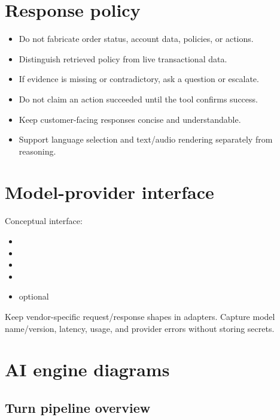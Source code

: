 \section{Response policy}

\begin{itemize}
\item Do not fabricate order status, account data, policies, or actions.
\item Distinguish retrieved policy from live transactional data.
\item If evidence is missing or contradictory, ask a question or escalate.
\item Do not claim an action succeeded until the tool confirms success.
\item Keep customer-facing responses concise and understandable.
\item Support language selection and text/audio rendering separately from reasoning.
\end{itemize}
\section{Model-provider interface}

Conceptual interface:

\begin{itemize}
\item {}
\item {}
\item {}
\item {}
\item optional 
\end{itemize}
Keep vendor-specific request/response shapes in adapters. Capture model name/version, latency, usage, and provider errors without storing secrets.

\section{AI engine diagrams}
\Needspace{176pt}
\subsection{Turn pipeline overview}



